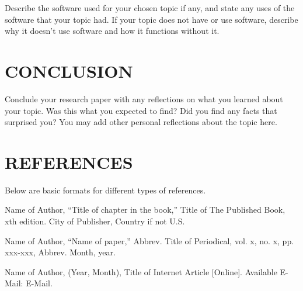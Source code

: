 \documentclass[letterpaper, 10 pt, conference]{IEEEconf}
\begin{document}
Describe the software used for your chosen topic if any,
and state any uses of the software that your topic had.
If your topic does not have or use software, describe why it
doesn't use software and how it functions without it.

\section{CONCLUSION}

Conclude your research paper with any reflections on what you
learned about your topic. Was this what you expected to find?
Did you find any facts that surprised you? You may add other
personal reflections about the topic here.

\section*{REFERENCES}

Below are basic formats for different types of references.

\begin{enumerate}[label={[\arabic*]}]
\item Name of Author, ``Title of chapter in the book,''
Title of The Published Book, xth edition. City of
Publisher, Country if not U.S.
\item Name of Author, “Name of paper,” Abbrev.
Title of Periodical, vol. x, no. x, pp. xxx-xxx,
Abbrev. Month, year.
\item Name of Author, (Year, Month),
Title of Internet Article [Online]. Available E-Mail:
E-Mail.
\end{enumerate}
\end{document}
